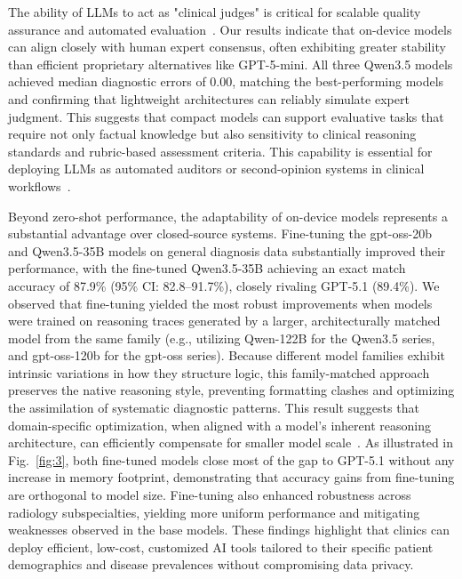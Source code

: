 \documentclass[10pt,journal,compsoc, onecolumn]{IEEEtran}
\begin{document}
The ability of LLMs to act as "clinical judges" is critical for scalable quality assurance and automated evaluation~\cite{kocaman2025clever, croxford2025evaluating}. Our results indicate that on-device models can align closely with human expert consensus, often exhibiting greater stability than efficient proprietary alternatives like GPT-5-mini. All three Qwen3.5 models achieved median diagnostic errors of 0.00, matching the best-performing models and confirming that lightweight architectures can reliably simulate expert judgment. This suggests that compact models can support evaluative tasks that require not only factual knowledge but also sensitivity to clinical reasoning standards and rubric-based assessment criteria. This capability is essential for deploying LLMs as automated auditors or second-opinion systems in clinical workflows~\cite{humaneval2025llmjudge, genovese2026artificial}.

Beyond zero-shot performance, the adaptability of on-device models represents a substantial advantage over closed-source systems. Fine-tuning the gpt-oss-20b and Qwen3.5-35B models on general diagnosis data substantially improved their performance, with the fine-tuned Qwen3.5-35B achieving an exact match accuracy of 87.9\% (95\% CI: 82.8--91.7\%), closely rivaling GPT-5.1 (89.4\%). We observed that fine-tuning yielded the most robust improvements when models were trained on reasoning traces generated by a larger, architecturally matched model from the same family (e.g., utilizing Qwen-122B for the Qwen3.5 series, and gpt-oss-120b for the gpt-oss series). Because different model families exhibit intrinsic variations in how they structure logic, this family-matched approach preserves the native reasoning style, preventing formatting clashes and optimizing the assimilation of systematic diagnostic patterns. This result suggests that domain-specific optimization, when aligned with a model's inherent reasoning architecture, can efficiently compensate for smaller model scale~\cite{davis2026medslice, guluzade2025elmtex, wind2025rar}. As illustrated in Fig.~\ref{fig:3}, both fine-tuned models close most of the gap to GPT-5.1 without any increase in memory footprint, demonstrating that accuracy gains from fine-tuning are orthogonal to model size. Fine-tuning also enhanced robustness across radiology subspecialties, yielding more uniform performance and mitigating weaknesses observed in the base models. These findings highlight that clinics can deploy efficient, low-cost, customized AI tools tailored to their specific patient demographics and disease prevalences without compromising data privacy.
\end{document}
